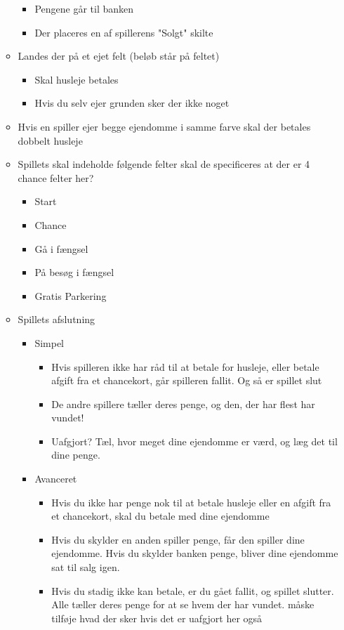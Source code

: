 \documentclass[../main.tex]{subfiles}
\begin{document}
\begin{enumerate}
\begin{itemize}
\begin{itemize}
           \item Pengene går til banken
           \item Der placeres en af spillerens "Solgt" skilte
       \end{itemize}
       \item Landes der på et ejet felt (beløb står på feltet)
       \begin{itemize}
           \item Skal husleje betales 
           \item Hvis du selv ejer grunden sker der ikke noget
       \end{itemize}
       \item Hvis en spiller ejer begge ejendomme i samme farve skal der betales dobbelt husleje
       \item Spillets skal indeholde følgende felter \todo skal de specificeres at der er 4 chance felter her?
       \begin{itemize}
           \item Start
           \item Chance
           \item Gå i fængsel
           \item På besøg i fængsel
           \item Gratis Parkering
       \end{itemize}
       \item Spillets afslutning
       \begin{itemize}
           \item Simpel
           \begin{itemize}
               \item Hvis spilleren ikke har råd til at betale for husleje, eller betale afgift fra et chancekort, går spilleren fallit. Og så er spillet slut
               \item De andre spillere tæller deres penge, og den, der har flest har vundet!
               \item Uafgjort? Tæl, hvor meget dine ejendomme er værd, og læg det til dine penge.
           \end{itemize}
           \item Avanceret
           \begin{itemize}
               \item Hvis du ikke har penge nok til at betale husleje eller en afgift fra et chancekort, skal du betale med dine ejendomme
               \item Hvis du skylder en anden spiller penge, får den spiller dine ejendomme. Hvis du skylder banken penge, bliver dine ejendomme sat til salg igen.
               \item Hvis du stadig ikke kan betale, er du gået fallit, og spillet slutter. Alle tæller deres penge for at se hvem der har vundet. \todo måske tilføje hvad der sker hvis det er uafgjort her også
           \end{itemize}
       \end{itemize}
   \end{itemize}


\end{enumerate}
\end{document}
